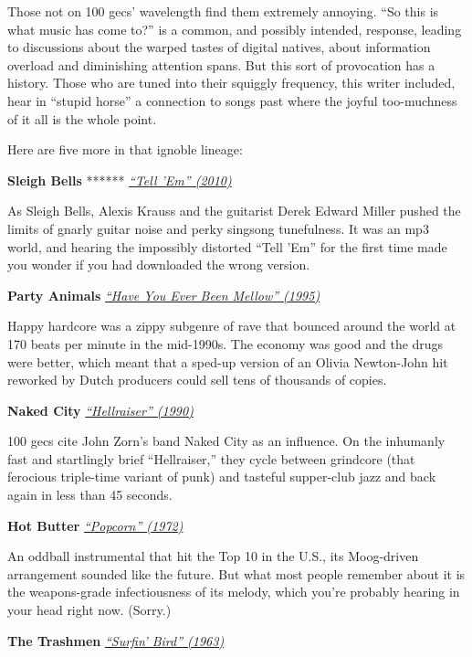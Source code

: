 Those not on 100 gecs' wavelength find them extremely annoying. ``So
this is what music has come to?'' is a common, and possibly intended,
response, leading to discussions about the warped tastes of digital
natives, about information overload and diminishing attention spans. But
this sort of provocation has a history. Those who are tuned into their
squiggly frequency, this writer included, hear in ``stupid horse'' a
connection to songs past where the joyful too-muchness of it all is the
whole point.

Here are five more in that ignoble lineage:

\textbf{Sleigh Bells} ******
\emph{\href{https://www.youtube.com/watch?v=c3bSCZXKvUA}{``Tell 'Em''
(2010)}}

As Sleigh Bells, Alexis Krauss and the guitarist Derek Edward Miller
pushed the limits of gnarly guitar noise and perky singsong tunefulness.
It was an mp3 world, and hearing the impossibly distorted ``Tell 'Em''
for the first time made you wonder if you had downloaded the wrong
version.

\textbf{Party Animals}
\emph{\href{https://www.youtube.com/watch?v=2er9d5hb_Fc}{``Have You Ever
Been Mellow'' (1995)}}

Happy hardcore was a zippy subgenre of rave that bounced around the
world at 170 beats per minute in the mid-1990s. The economy was good and
the drugs were better, which meant that a sped-up version of an Olivia
Newton-John hit reworked by Dutch producers could sell tens of thousands
of copies.

\textbf{Naked City}
\emph{\href{https://www.youtube.com/watch?v=D12QW4sh1-k}{``Hellraiser''
(1990)}}

100 gecs cite John Zorn's band Naked City as an influence. On the
inhumanly fast and startlingly brief ``Hellraiser,'' they cycle between
grindcore (that ferocious triple-time variant of punk) and tasteful
supper-club jazz and back again in less than 45 seconds.

\textbf{Hot Butter}
\emph{\href{https://www.youtube.com/watch?v=YK3ZP6frAMc}{``Popcorn''
(1972)}}

An oddball instrumental that hit the Top 10 in the U.S., its Moog-driven
arrangement sounded like the future. But what most people remember about
it is the weapons-grade infectiousness of its melody, which you're
probably hearing in your head right now. (Sorry.)

\textbf{The Trashmen}
\emph{\href{https://www.youtube.com/watch?v=9Gc4QTqslN4}{``Surfin'
Bird'' (1963)}}

